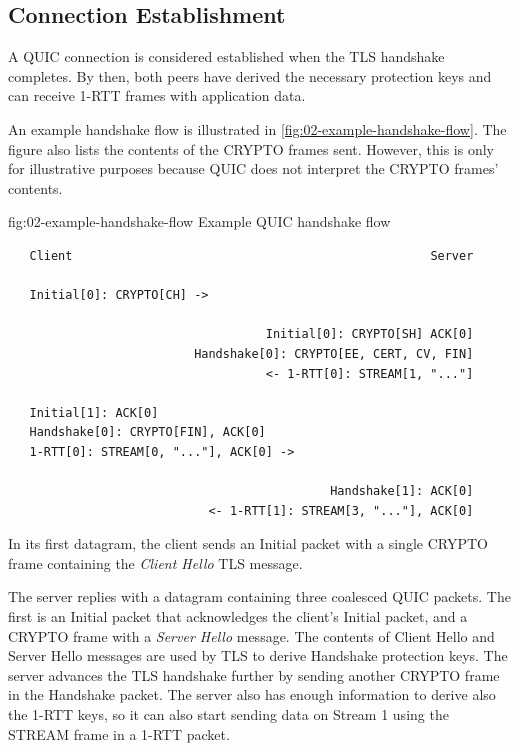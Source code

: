 \subsection{Connection Establishment}

A QUIC connection is considered established when the TLS handshake completes. By then, both peers
have derived the necessary protection keys and can receive 1-RTT frames with application data.

An example handshake flow is illustrated in \autoref{fig:02-example-handshake-flow}. The figure also
lists the contents of the CRYPTO frames sent. However, this is only for illustrative purposes
because QUIC does not interpret the CRYPTO frames' contents.

\begin{myFigure} {fig:02-example-handshake-flow} {Example QUIC handshake flow}

\begin{verbatim}
   Client                                                  Server

   Initial[0]: CRYPTO[CH] ->

                                    Initial[0]: CRYPTO[SH] ACK[0]
                          Handshake[0]: CRYPTO[EE, CERT, CV, FIN]
                                    <- 1-RTT[0]: STREAM[1, "..."]

   Initial[1]: ACK[0]
   Handshake[0]: CRYPTO[FIN], ACK[0]
   1-RTT[0]: STREAM[0, "..."], ACK[0] ->

                                             Handshake[1]: ACK[0]
                            <- 1-RTT[1]: STREAM[3, "..."], ACK[0]
\end{verbatim}


\end{myFigure}

In its first datagram, the client sends an Initial packet with a single CRYPTO frame containing the
\textit{Client Hello} TLS message.

The server replies with a datagram containing three coalesced QUIC packets. The first is an Initial
packet that acknowledges the client's Initial packet, and a CRYPTO frame with a \textit{Server
Hello} message. The contents of Client Hello and Server Hello messages are used by TLS to derive
Handshake protection keys. The server advances the TLS handshake further by sending another CRYPTO
frame in the Handshake packet. The server also has enough information to derive also the 1-RTT keys,
so it can also start sending data on Stream 1 using the STREAM frame in a 1-RTT packet.

